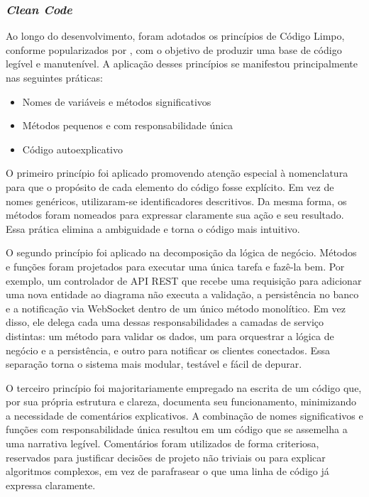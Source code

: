 \subsubsection[\textit{Clean Code}]{\textit{Clean Code}}
Ao longo do desenvolvimento, foram adotados os princípios de Código Limpo, conforme popularizados por , com o objetivo de produzir uma base de código legível e manutenível. A aplicação desses princípios se manifestou principalmente nas seguintes práticas:

\begin{itemize}
    \item Nomes de variáveis e métodos significativos
    \item Métodos pequenos e com responsabilidade única
    \item Código autoexplicativo
\end{itemize}

O primeiro princípio foi aplicado promovendo atenção especial à nomenclatura para que o propósito de cada elemento do código fosse explícito. Em vez de nomes genéricos, utilizaram-se identificadores descritivos. Da mesma forma, os métodos foram nomeados para expressar claramente sua ação e seu resultado. Essa prática elimina a ambiguidade e torna o código mais intuitivo.

O segundo princípio foi aplicado na decomposição da lógica de negócio. Métodos e funções foram projetados para executar uma única tarefa e fazê-la bem. Por exemplo, um controlador de API REST que recebe uma requisição para adicionar uma nova entidade ao diagrama não executa a validação, a persistência no banco e a notificação via WebSocket dentro de um único método monolítico. Em vez disso, ele delega cada uma dessas responsabilidades a camadas de serviço distintas: um método para validar os dados, um para orquestrar a lógica de negócio e a persistência, e outro para notificar os clientes conectados. Essa separação torna o sistema mais modular, testável e fácil de depurar.

O terceiro princípio foi majoritariamente empregado na escrita de um código que, por sua própria estrutura e clareza, documenta seu funcionamento, minimizando a necessidade de comentários explicativos. A combinação de nomes significativos e funções com responsabilidade única resultou em um código que se assemelha a uma narrativa legível. Comentários foram utilizados de forma criteriosa, reservados para justificar decisões de projeto não triviais ou para explicar algoritmos complexos, em vez de parafrasear o que uma linha de código já expressa claramente.

